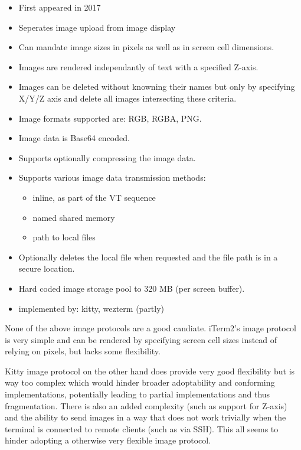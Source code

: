 \documentclass[a4paper]{article}
\begin{document}
\begin{itemize}
    \item First appeared in 2017
    \item Seperates image upload from image display
    \item Can mandate image sizes in pixels as well as in screen cell dimensions.
    \item Images are rendered independantly of text with a specified Z-axis.
    \item Images can be deleted without knowning their names but only by specifying X/Y/Z axis
          and delete all images intersecting these criteria.
    \item Image formats supported are: RGB, RGBA, PNG.
    \item Image data is Base64 encoded.
    \item Supports optionally compressing the image data.
    \item Supports various image data transmission methods:
        \begin{itemize}
            \item inline, as part of the VT sequence
            \item named shared memory
            \item path to local files
        \end{itemize}
    \item Optionally deletes the local file when requested and the file path is in a secure location.
    \item Hard coded image storage pool to 320 MB (per screen buffer).
    \item implemented by: kitty, wezterm (partly)
\end{itemize}

None of the above image protocols are a good candiate. iTerm2's image protocol is very simple and
can be rendered by specifying screen cell sizes instead of relying on pixels, but lacks some
flexibility.

Kitty image protocol on the other hand does provide very good flexibility but is way too complex which
would hinder broader adoptability and conforming implementations, potentially leading to partial
implementations and thus fragmentation.
There is also an added complexity (such as support for Z-axis) and the ability
to send images in a way that does not work trivially when the terminal is
connected to remote clients (such as via SSH). This all seems to hinder
adopting a otherwise very flexible image protocol.
\end{document}
